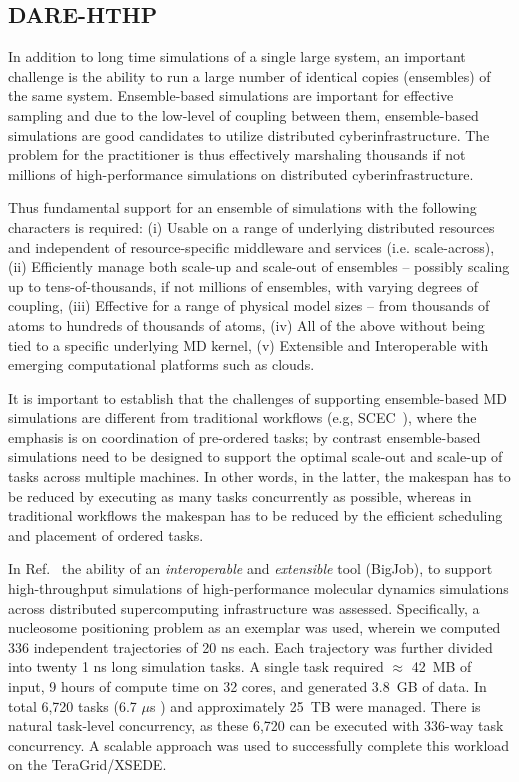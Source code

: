 \documentclass[]{svjour3}
\begin{document}
\subsection{DARE-HTHP}

In addition to long time simulations of a single large system, an
important challenge is the ability to run a large number of identical
copies (ensembles) of the same system. Ensemble-based simulations are
important for effective sampling and due to the low-level of coupling
between them, ensemble-based simulations are good candidates to
utilize distributed cyberinfrastructure.  The problem for the
practitioner is thus effectively marshaling thousands if not millions
of high-performance simulations on distributed cyberinfrastructure.

Thus fundamental support for an ensemble of simulations with the
following characters is required: (i) Usable on a range of underlying
distributed resources and independent of resource-specific middleware
and services (i.e. scale-across), (ii) Efficiently manage both
scale-up and scale-out of ensembles -- possibly scaling up to
tens-of-thousands, if not millions of ensembles, with varying degrees
of coupling, (iii) Effective for a range of physical model sizes --
from thousands of atoms to hundreds of thousands of atoms, (iv) All of
the above without being tied to a specific underlying MD kernel, (v)
Extensible and Interoperable with emerging computational platforms
such as clouds.

It is important to establish that the challenges of supporting
ensemble-based MD simulations are different from traditional workflows
(e.g, SCEC~\cite{scec-sc10}), where the emphasis is on coordination of
pre-ordered tasks; by contrast ensemble-based simulations need to be
designed to support the optimal scale-out and scale-up of tasks across
multiple machines. In other words, in the latter, the makespan has to
be reduced by executing as many tasks concurrently as possible,
whereas in traditional workflows the makespan has to be reduced by the
efficient scheduling and placement of ordered tasks.

In Ref.~\cite{xsede12_ensemble} the ability of an {\it interoperable}
and {\it extensible} \pilotjob tool (BigJob), to support
high-throughput simulations of high-performance molecular dynamics
simulations across distributed supercomputing infrastructure was
assessed.  Specifically, a nucleosome positioning problem as an
exemplar was used, wherein we computed 336 independent trajectories of
20 ns each.  Each trajectory was further divided into twenty 1 ns long
simulation tasks. A single task required $\approx$ 42~MB of input, 9
hours of compute time on 32 cores, and generated 3.8~GB of data.  In
total 6,720 tasks (6.7 $ \mu $s ) and approximately 25~TB were
managed.  There is natural task-level concurrency, as these 6,720 can
be executed with 336-way task concurrency.  A scalable \pilotjob
approach was used to successfully complete this workload on the
TeraGrid/XSEDE.
\end{document}
